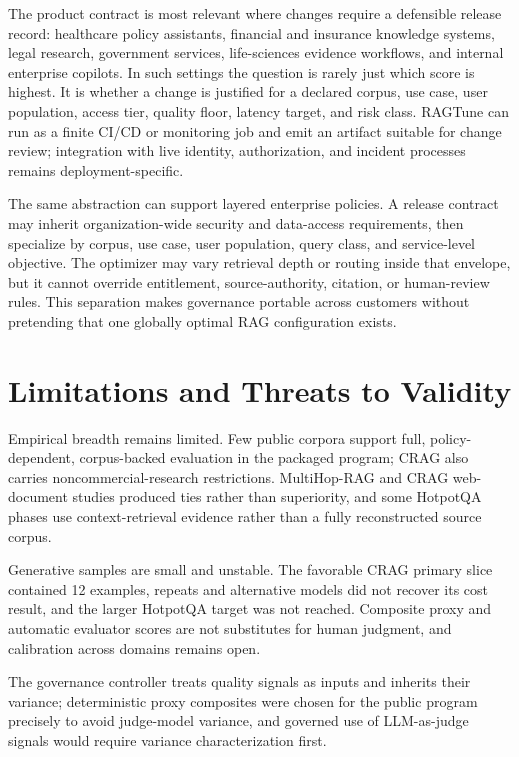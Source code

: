 \documentclass[11pt]{article}
\begin{document}
The product contract is most relevant where changes require a defensible release record: healthcare policy assistants, financial and insurance knowledge systems, legal research, government services, life-sciences evidence workflows, and internal enterprise copilots. In such settings the question is rarely just which score is highest. It is whether a change is justified for a declared corpus, use case, user population, access tier, quality floor, latency target, and risk class. RAGTune can run as a finite CI/CD or monitoring job and emit an artifact suitable for change review; integration with live identity, authorization, and incident processes remains deployment-specific.

The same abstraction can support layered enterprise policies. A release contract may inherit organization-wide security and data-access requirements, then specialize by corpus, use case, user population, query class, and service-level objective. The optimizer may vary retrieval depth or routing inside that envelope, but it cannot override entitlement, source-authority, citation, or human-review rules. This separation makes governance portable across customers without pretending that one globally optimal RAG configuration exists.

\section{Limitations and Threats to Validity}
Empirical breadth remains limited. Few public corpora support full, policy-dependent, corpus-backed evaluation in the packaged program; CRAG also carries noncommercial-research restrictions. MultiHop-RAG and CRAG web-document studies produced ties rather than superiority, and some HotpotQA phases use context-retrieval evidence rather than a fully reconstructed source corpus.

Generative samples are small and unstable. The favorable CRAG primary slice contained 12 examples, repeats and alternative models did not recover its cost result, and the larger HotpotQA target was not reached. Composite proxy and automatic evaluator scores are not substitutes for human judgment, and calibration across domains remains open.

The governance controller treats quality signals as inputs and inherits their variance; deterministic proxy composites were chosen for the public program precisely to avoid judge-model variance, and governed use of LLM-as-judge signals would require variance characterization first.
\end{document}
